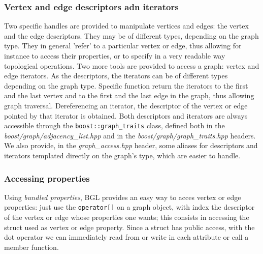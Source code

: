 \documentclass[10pt]{article} %
\newcommand{\classname}[1]{\texttt{#1}}
\begin{document}
	\subsubsection{Vertex and edge descriptors adn iterators}
	Two specific handles are provided to manipulate vertices and edges: the vertex and the edge descriptors. They may be of different types, depending on the graph type. They in general 'refer' to a particular vertex or edge, thus allowing for instance to access their properties, or to specify in a very readable way topological operations. \newline
	Two more tools are provided to access a graph: vertex and edge iterators. As the descriptors, the iterators can be of different types depending on the graph type. Specific function return the iterators to the first and the last vertex and to the first and the last edge in the graph, thus allowing graph traversal. Dereferencing an iterator, the descriptor of the vertex or edge pointed by that iterator is obtained. \newline
	Both descriptors and iterators are always accessible through the \classname{boost::graph\_traits} class, defined both in the \textit{boost/graph/adjacency\_list.hpp} and in the \textit{boost/graph/graph\_traits.hpp} headers. We also provide, in the \textit{graph\_access.hpp} header, some aliases for descriptors and iterators templated directly on the graph's type, which are easier to handle.
	
	\subsubsection{Accessing properties}
	Using \textit{bundled properties}, BGL provides an easy way to acces vertex or edge properties: just use the \texttt{operator[]} on a graph object, with index the descriptor of the vertex or edge whose properties one wants; this consists in accessing the struct used as vertex or edge property. Since a struct has public access, with the dot operator we can immediately read from or write in each attribute or call a member function.	
	
	\newpage
\end{document}
